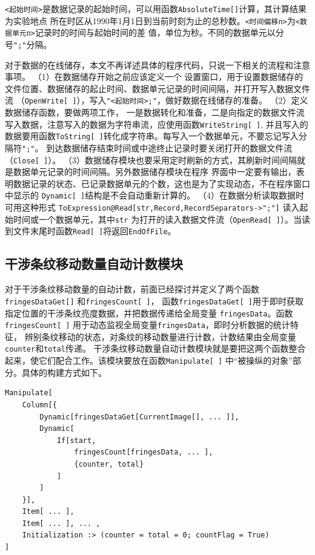 \documentclass[UTF8,a4paper,12pt]{article}
\begin{document}
\verb|<起始时间>|是数据记录的起始时间，可以用函数\verb|AbsoluteTime[]|计算，其计算结果为实验地点
所在时区从1990年1月1日到当前时刻为止的总秒数。\verb|<时间偏移n>|为\verb|<数据单元n>|记录时的时间与起始时间的差
值，单位为秒。不同的数据单元以分号\verb|";"|分隔。

对于数据的在线储存，本文不再详述具体的程序代码，只说一下相关的流程和注意事项。
（1）在数据储存开始之前应该定义一个
设置窗口，用于设置数据储存的文件位置、数据储存的起止时间、数据单元记录的时间间隔，并打开写入数据文件流
（\verb|OpenWrite[ ]|），写入\verb|"<起始时间>;"|，做好数据在线储存的准备。
（2）定义数据储存函数，要做两项工作，
一是数据转化和准备，二是向指定的数据文件流写入数据，注意写入的数据为字符串流，应使用函数\verb|WriteString[ ]|,
并且写入的数据要用函数\verb|ToString[ ]|转化成字符串。每写入一个数据单元，不要忘记写入分隔符\verb|";"|。
到达数据储存结束时间或中途终止记录时要关闭打开的数据文件流（\verb|Close[ ]|）。
（3）数据储存模块也要采用定时刷新的方式，其刷新时间间隔就是数据单元记录的时间间隔。另外数据储存模块在程序
界面中一定要有输出，表明数据记录的状态、已记录数据单元的个数，这也是为了实现动态，不在程序窗口中显示的
\verb|Dynamic[ ]|结构是不会自动重新计算的。
（4）在数据分析读取数据时可用这种形式
\verb|ToExpression@Read[str,Record,RecordSeparators->";"]| 读入起始时间或一个数据单元，其中\verb|str|
为打开的读入数据文件流（\verb|OpenRead[ ]|）。当读到文件末尾时函数\verb|Read[ ]|将返回\verb|EndOfFile|。

\subsection{干涉条纹移动数量自动计数模块}
对于干涉条纹移动数量的自动计数，前面已经探讨并定义了两个函数\\
\verb|fringesDataGet[]| 和\verb|fringesCount[ ]|，
函数\verb|fringesDataGet[ ]|用于即时获取指定位置的干涉条纹亮度数据，并把数据传递给全局变量
\verb|fringesData|。函数\verb|fringesCount[ ]| 用于动态监视全局变量\verb|fringesData|，即时分析数据的统计特征，
辨别条纹移动的状态，对条纹的移动数量进行计数，计数结果由全局变量\verb|counter|和\verb|total|传递。
干涉条纹移动数量自动计数模块就是要把这两个函数整合起来，使它们配合工作。该模块要放在函数\verb|Manipulate[ ]|
中``被操纵的对象''部分。具体的构建方式如下。

\begin{verbatim}
Manipulate[
    Column[{
        Dynamic[fringesDataGet[CurrentImage[], ... ]],
        Dynamic[
            If[start,
                fringesCount[fringesData, ... ],
                {counter, total}
            ]
        ]
    }],
    Item[ ... ], 
    Item[ ... ], ... ,
    Initialization :> (counter = total = 0; countFlag = True)
]
\end{verbatim}
\end{document}
